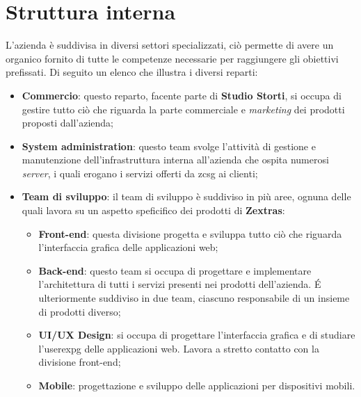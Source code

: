 \section{Struttura interna}
    L'azienda è suddivisa in diversi settori specializzati, ciò permette di avere un organico fornito di tutte le competenze necessarie per raggiungere gli obiettivi prefissati. Di seguito un elenco che illustra i diversi reparti:
    \begin{itemize}
        \item \textbf{Commercio}: questo reparto, facente parte di \textbf{Studio Storti}, si occupa di gestire tutto ciò che riguarda la parte commerciale e \textit{marketing} dei prodotti proposti dall'azienda;
        \item \textbf{System administration}: questo team svolge l'attività di gestione e manutenzione dell'infrastruttura interna all'azienda che ospita numerosi \textit{server}, i quali erogano i servizi offerti da \gls{zcsg} ai clienti;
        \item \textbf{Team di sviluppo}:
            il team di sviluppo è suddiviso in più aree, ognuna delle quali lavora su un aspetto speficifico dei prodotti di \textbf{Zextras}:
            \begin{itemize}
                \item \textbf{Front-end}: questa divisione progetta e sviluppa tutto ciò che riguarda l'interfaccia grafica delle applicazioni web;
                \item \textbf{Back-end}: questo team si occupa di progettare e implementare l'architettura di tutti i servizi presenti nei prodotti dell'azienda. \'E ulteriormente suddiviso in due team, ciascuno responsabile di un insieme di prodotti diverso;
                \item \textbf{UI/UX Design}: si occupa di progettare l'interfaccia grafica e di studiare l'\gls{userexpg} delle applicazioni web. Lavora a stretto contatto con la divisione front-end;
                \item \textbf{Mobile}: progettazione e sviluppo delle applicazioni per dispositivi mobili.
            \end{itemize}
    \end{itemize}

\newpage

